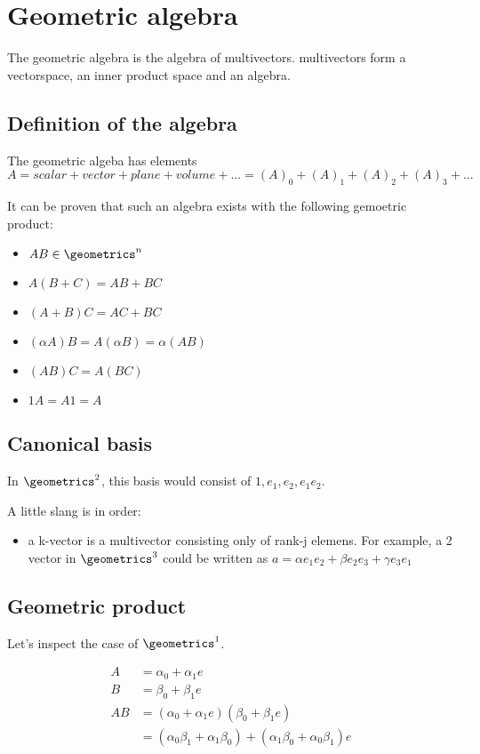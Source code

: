 \section{Geometric algebra}

The geometric algebra is the algebra of multivectors. multivectors form a vectorspace, an inner product space and an algebra. 

\subsection{Definition of the algebra}
The geometric algeba has elements 
$$A = scalar + vector + plane + volume + ... = (A)_0 + (A)_1 + (A)_2 + (A)_3 + ...$$

It can be proven that such an algebra exists with the following gemoetric product: 
\begin{itemize}
    \item $AB \in \geometrics^n$
    \item $A(B+C) = AB + BC$
    \item $(A + B)C = AC + BC$
    \item $(\alpha A)B = A(\alpha B) = \alpha (AB)$
    \item $(AB)C = A(BC)$
    \item $1A = A1 = A$
\end{itemize}


\subsection{Canonical basis}
In $\geometrics^2$, this basis would consist of $1, e_1, e_2, e_1e_2$.

A little slang is in order: 
\begin{itemize}
    \item a k-vector is a multivector consisting only of rank-j elemens. For example, a 2 vector in $\geometrics^3$ could be written as $a = \alpha e_1e_2 + \beta e_2e_3 + \gamma e_3e_1$
\end{itemize}

\subsection{Geometric product}
Let's inspect the case of $\geometrics^1$.

\begin{equation}
    \begin{split}
        A &= \alpha_0 + \alpha_1 e \\
        B &= \beta_0 + \beta_1 e \\
        AB &= (\alpha_0 + \alpha_1 e)(\beta_0 + \beta_1 e) \\
          &= (\alpha_0 \beta_1 + \alpha_1 \beta_0) + (\alpha_1 \beta_0 + \alpha_0 \beta_1) e \\
    \end{split}
\end{equation}


